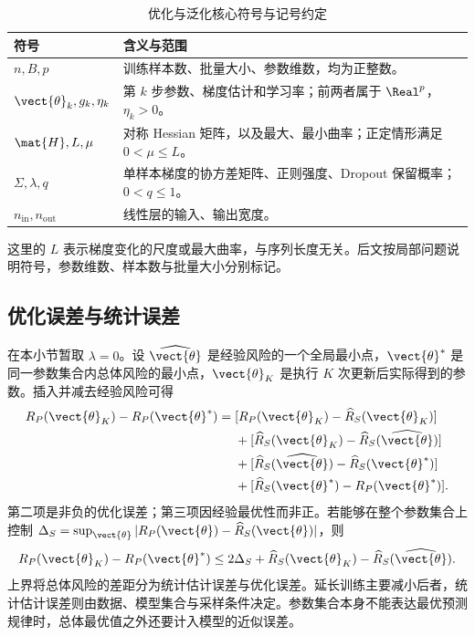 \documentclass[../textbook.tex]{subfiles}
\begin{document}
\begin{table}[htbp]
\centering
\caption{优化与泛化核心符号与记号约定}
\label{tab:opt-symbols}
\begin{tabularx}{\linewidth}{lX}
\toprule
符号 & 含义与范围\\\midrule
$n,B,p$ & 训练样本数、批量大小、参数维数，均为正整数。\\
$\vect{\theta}_k,g_k,\eta_k$ & 第 $k$ 步参数、梯度估计和学习率；前两者属于 $\Real^p$，$\eta_k>0$。\\
$\mat{H},L,\mu$ & 对称 Hessian 矩阵，以及最大、最小曲率；正定情形满足 $0<\mu\leq L$。\\
$\Sigma,\lambda,q$ & 单样本梯度的协方差矩阵、正则强度、Dropout 保留概率；$0<q\leq1$。\\
$n_{\mathrm{in}},n_{\mathrm{out}}$ & 线性层的输入、输出宽度。\\
\bottomrule
\end{tabularx}
\end{table}
这里的 $L$ 表示梯度变化的尺度或最大曲率，与序列长度无关。后文按局部问题说明符号，参数维数、样本数与批量大小分别标记。

\subsection{优化误差与统计误差}
在本小节暂取 $\lambda=0$。设 $\widehat{\vect{\theta}}$ 是经验风险的一个全局最小点，$\vect{\theta}^*$ 是同一参数集合内总体风险的最小点，$\vect{\theta}_K$ 是执行 $K$ 次更新后实际得到的参数。插入并减去经验风险可得
\begin{align}
 R_P(\vect{\theta}_K)-R_P(\vect{\theta}^*)
 ={}&[R_P(\vect{\theta}_K)-\widehat R_S(\vect{\theta}_K)]\notag\\
 &+[\widehat R_S(\vect{\theta}_K)-\widehat R_S(\widehat{\vect{\theta}})]\notag\\
 &+[\widehat R_S(\widehat{\vect{\theta}})-\widehat R_S(\vect{\theta}^*)]\notag\\
 &+[\widehat R_S(\vect{\theta}^*)-R_P(\vect{\theta}^*)].\label{eq:opt-error-split}
\end{align}
第二项是非负的优化误差；第三项因经验最优性而非正。若能够在整个参数集合上控制
$\Delta_S=\sup_{\vect{\theta}}|R_P(\vect{\theta})-\widehat R_S(\vect{\theta})|$，则
\begin{equation}
 R_P(\vect{\theta}_K)-R_P(\vect{\theta}^*)
 \leq 2\Delta_S+\widehat R_S(\vect{\theta}_K)-\widehat R_S(\widehat{\vect{\theta}}).
\end{equation}
上界将总体风险的差距分为统计估计误差与优化误差。延长训练主要减小后者，统计估计误差则由数据、模型集合与采样条件决定。参数集合本身不能表达最优预测规律时，总体最优值之外还要计入模型的近似误差。
\end{document}
